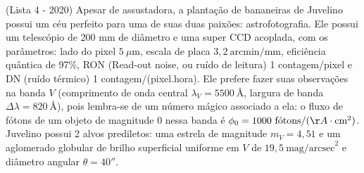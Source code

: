 \documentclass[11pt]{article}
\begin{document}
\begin{pproblem}
    (Lista 4 - 2020) Apesar de assustadora, a plantação de bananeiras de Juvelino possui um céu perfeito para uma de suas duas paixões: astrofotografia. Ele possui um telescópio de 200 mm de diâmetro e uma super CCD acoplada, com os parâmetros: lado do pixel \(5\ \mu\text{m}\), escala de placa \(3,2\ \text{arcmin/mm}\), eficiência quântica de 97\%, RON (Read-out noise, ou ruído de leitura) 1 contagem/pixel e DN (ruído térmico) 1 contagem/(pixel.hora). Ele prefere fazer suas observações na banda \(V\) (comprimento de onda central \(\lambda_V = 5500\ \text{Å}\), largura de banda \(\Delta \lambda = 820\ \text{Å}\)), pois lembra-se de um número mágico associado a ela: o fluxo de fótons de um objeto de magnitude 0 nessa banda é \(\phi_0 = 1000\ \text{fótons/}(\AA\cdot \text{cm}^2)\). Juvelino possui 2 alvos prediletos: uma estrela de magnitude \(m_V = 4,51\) e um aglomerado globular de brilho superficial uniforme em \(V\) de \(19,5\ \text{mag/arcsec}^2\) e diâmetro angular \(\theta = 40''\).
\end{pproblem}
\end{document}

